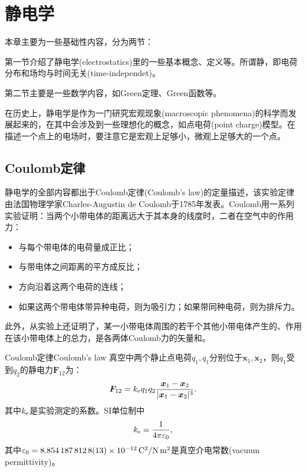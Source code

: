\chapter{静电学}
\label{chap:electrostatics}

本章主要为一些基础性内容，分为两节：
\begin{compactenum}
    \item 第一节介绍了静电学(electrostatics)里的一些基本概念、定义等。所谓静，即电荷分布和场均与时间无关(time-independet)。
    \item 第二节主要是一些数学内容，如Green定理、Green函数等。
\end{compactenum}
在历史上，静电学是作为一门研究宏观现象(macroscopic phenomena)的科学而发展起来的，在其中会涉及到一些理想化的概念，如点电荷(point charge)模型。在描述一个点上的电场时，要注意它是宏观上足够小，微观上足够大的一个点。

\section{Coulomb定律}

静电学的全部内容都出于Coulomb定律(Coulomb's law)的定量描述，该实验定律由法国物理学家Charles-Augustin de Coulomb于1785年发表。Coulomb用一系列实验证明：当两个小带电体的距离远大于其本身的线度时，二者在空气中的作用力：
\begin{itemize}
    \item 与每个带电体的电荷量成正比；
    \item 与带电体之间距离的平方成反比；
    \item 方向沿着这两个电荷的连线；
    \item 如果这两个带电体带异种电荷，则为吸引力；如果带同种电荷，则为排斥力。
\end{itemize}
此外，从实验上还证明了，某一小带电体周围的若干个其他小带电体产生的、作用在该小带电体上的总力，是各两体Coulomb力的矢量和。

\begin{theorem}{Coulomb定律}{Coulomb's law}
    真空中两个静止点电荷$q_1,q_1$分别位于$\bm x_1,\bm x_2$，则$q_1$受到$q_2$的静电力$\bm F_{12}$为：
    \begin{align}
        \label{eqn:Coulomb law}
        \bm F_{12}=k_\mathrm e q_1q_2\frac{\bm x_1-\bm x_2}{|\bm x_1-\bm x_2|^3}.
    \end{align}
    其中$k_\mathrm e$是实验测定的系数。SI单位制中
    \[
        k_\mathrm e=\frac1{4\pi\varepsilon_0},
    \]
    其中$\varepsilon_0=\SI{8.8541878128(13)E-12}{C^2/N.m^2}$是真空介电常数(vacuum permittivity)。
\end{theorem}

